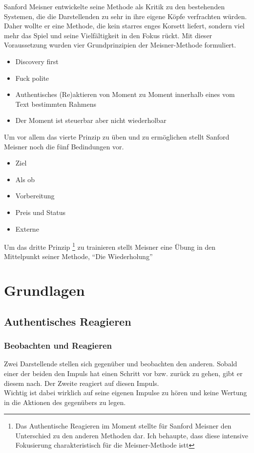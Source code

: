 \documentclass[ngerman, a4paper, twoside]{scrbook}%
\begin{document}
	Sanford Meisner entwickelte seine Methode als Kritik zu den bestehenden Systemen, die die Darstellenden zu sehr in ihre eigene Köpfe verfrachten würden. Daher wollte er eine Methode, die kein starres enges Korsett liefert, sondern viel mehr das Spiel und seine Vielfältigkeit in den Fokus rückt. Mit dieser Voraussetzung wurden vier Grundprinzipien der Meisner-Methode formuliert.
	\begin{itemize}
		\item Discovery first
		 \item Fuck polite
		 \item Authentisches (Re)aktieren von Moment zu Moment innerhalb eines vom Text bestimmten Rahmens
		 \item Der Moment ist steuerbar aber nicht wiederholbar
	\end{itemize}
	Um vor allem das vierte Prinzip zu üben und zu ermöglichen stellt Sanford Meisner noch die fünf Bedindungen vor.
	\begin{itemize}
		\item Ziel
		\item Als ob
		\item Vorbereitung
		\item Preis und Status
		\item Externe
	\end{itemize}
	Um das dritte Prinzip
	\footnote{Das Authentische Reagieren im Moment stellte für Sanford Meisner den Unterschied zu den anderen Methoden dar. Ich behaupte, dass diese intensive Fokusierung charakteristisch für die Meisner-Methode istt}
	 zu trainieren stellt Meisner eine Übung in den Mittelpunkt seiner Methode, "`Die Wiederholung"'


	\section{Grundlagen}

	\subsection{Authentisches Reagieren}
	\subsubsection{Beobachten und Reagieren}
	Zwei Darstellende stellen sich gegenüber und beobachten den anderen. Sobald einer der beiden den Impuls hat einen Schritt vor bzw. zurück zu gehen, gibt er diesem nach. Der Zweite reagiert auf diesen Impuls.\\
	Wichtig ist dabei wirklich auf seine eigenen Impulse zu hören und keine Wertung in die Aktionen des gegenübers zu legen. 
\end{document}
